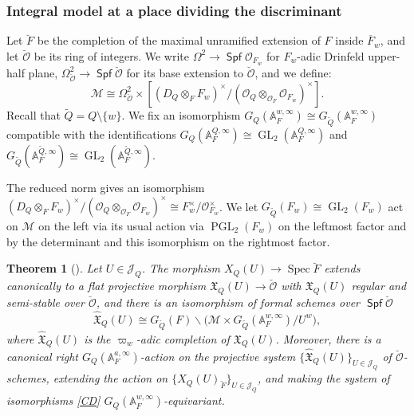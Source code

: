 \documentclass[a4paper, notitlepage, 10pt]{amsart}
\theoremstyle{plain} %
\newtheorem{theorem}{Theorem}[section]
\theoremstyle{definition} %
\theoremstyle{remark} %
\numberwithin{equation}{section}
\newcommand{\GL}{\operatorname{GL}} %
\newcommand{\Spec}{\operatorname{Spec}} %
\newcommand{\Spf}{\operatorname{\mathsf{Spf}}} %
\newcommand{\PGL}{\operatorname{PGL}} %
\begin{document}
\subsubsection{ Integral model at a place dividing the discriminant}

Let $\breve{F}$ be the completion of the maximal unramified extension of $F$ inside $\overline{F}_w$, and let $\breve{\mathcal{O}}$ be its ring of integers. We write $\Omega^2\rightarrow \Spf \mathcal{O}_{F_w}$ for $F_w$-adic Drinfeld upper-half plane, $\Omega^2_{\breve{\mathcal{O}}}\rightarrow \Spf \breve{\mathcal{O}}$ for its base extension to $\breve{\mathcal{O}}$, and we define:
\begin{equation*}
    \mathcal{M} \cong \Omega^2_{\breve{\mathcal{O}}} \times \left[(D_Q\otimes_F F_w)^\times/(\mathcal{O}_Q\otimes_{\mathcal{O}_{F}}\mathcal{O}_{F_w})^\times \right].
\end{equation*}
Recall that $\widetilde{Q}=Q\setminus\{w\}$. We fix an isomorphism $G_Q(\mathbb{A}_F^{w,\infty})\cong G_{\widetilde{Q}}(\mathbb{A}_F^{w,\infty})$ compatible with the identifications $G_Q(\mathbb{A}_F^{Q,\infty})\cong \GL_2(\mathbb{A}_F^{Q,\infty})$ and $G_{\widetilde{Q}}(\mathbb{A}_F^{\widetilde{Q},\infty})\cong\GL_2(\mathbb{A}_F^{\widetilde{Q},\infty})$.

The reduced norm gives an isomorphism $(D_Q\otimes_F F_w)^\times/(\mathcal{O}_Q\otimes_{\mathcal{O}_{F}}\mathcal{O}_{F_w})^\times\cong F_w^\times/\mathcal{O}_{F_w}^\times$. We let $G_{\widetilde{Q}}(F_w)\cong \GL_2(F_w)$ act on $\mathcal{M}$ on the left via its usual action via $\PGL_2(F_w)$ on the leftmost factor and by the determinant and this isomorphism on the rightmost factor.
\begin{theorem}[{\cite[Theorem 4.5]{Tho16}}]\label{integralmodelvinQ}
    Let $U\in \mathcal{J}_Q$. The morphism $X_Q(U)\rightarrow \Spec \breve{F}$ extends canonically to a flat projective morphism ${\mathfrak{X}_{Q}}(U)\rightarrow \breve{\mathcal{O}}$ with ${\mathfrak{X}_{Q}}(U)$ regular and semi-stable over $\breve{\mathcal{O}}$, and there is an isomorphism of formal schemes over $\Spf \breve{\mathcal{O}}$
    \begin{equation}\label{CD}
       { \widehat{\mathfrak{X}}_{Q}}(U)\cong G_{\widetilde{Q}}(F)\backslash \big(\mathcal{M}\times G_{\widetilde{Q}}(\mathbb{A}_F^{w,\infty})/U^w\big),
    \end{equation}
where ${ \widehat{\mathfrak{X}}_{Q}}(U)$ is the $\varpi_w$-adic completion of $ { \mathfrak{X}_{Q}}(U)$. Moreover, there is a canonical right $G_Q(\mathbb{A}_F^{a,\infty})$-action on the projective system $\{ { \widehat{\mathfrak{X}}_{Q}}(U)\}_{U\in \mathcal{J}_Q}$ of $\breve{\mathcal{O}}$-schemes, extending the action on $\{X_Q(U)_{\breve{F}}\}_{U\in \mathcal{J}_Q}$, and making the system of isomorphisms \eqref{CD} $G_Q(\mathbb{A}_F^{w,\infty})$-equivariant.
\end{theorem}
\end{document}
